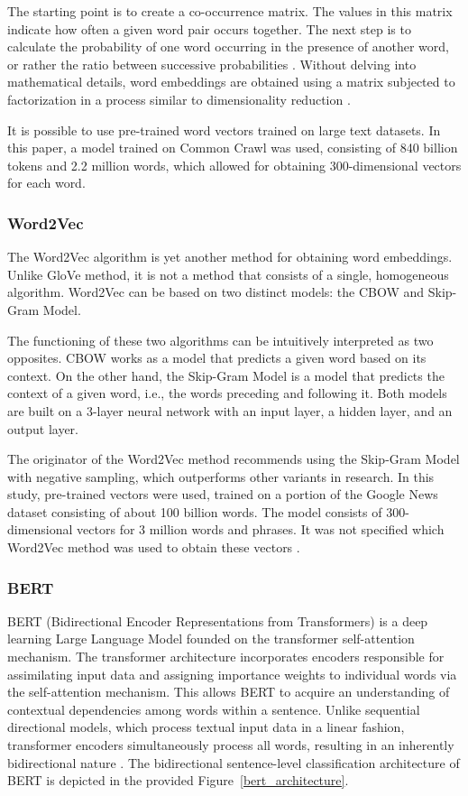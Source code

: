 The starting point is to create a co-occurrence matrix. The values in this matrix indicate how often a given word pair occurs together. The next step is to calculate the probability of one word occurring in the presence of another word, or rather the ratio between successive probabilities \autocite{Pennington2014}. Without delving into mathematical details, word embeddings are obtained using a matrix subjected to factorization in a process similar to dimensionality reduction \autocite{Albrecht2020}.

It is possible to use pre-trained word vectors trained on large text datasets. In this paper, a model trained on Common Crawl was used, consisting of 840 billion tokens and 2.2 million words, which allowed for obtaining 300-dimensional vectors for each word.

\subsubsection{Word2Vec}
The Word2Vec algorithm is yet another method for obtaining word embeddings. Unlike GloVe method, it is not a method that consists of a single, homogeneous algorithm. Word2Vec can be based on two distinct models: the CBOW and Skip-Gram Model.

The functioning of these two algorithms can be intuitively interpreted as two opposites. CBOW works as a model that predicts a given word based on its context. On the other hand, the Skip-Gram Model is a model that predicts the context of a given word, i.e., the words preceding and following it. Both models are built on a 3-layer neural network with an input layer, a hidden layer, and an output layer.

The originator of the Word2Vec method recommends using the Skip-Gram Model with negative sampling, which outperforms other variants in research. In this study, pre-trained vectors were used, trained on a portion of the Google News dataset consisting of about 100 billion words. The model consists of 300-dimensional vectors for 3 million words and phrases. It was not specified which Word2Vec method was used to obtain these vectors \autocite{Mikolov2013}.

\subsubsection{BERT}
BERT (Bidirectional Encoder Representations from Transformers) is a deep learning Large Language Model founded on the transformer self-attention mechanism. The transformer architecture incorporates encoders responsible for assimilating input data and assigning importance weights to individual words via the self-attention mechanism. This allows BERT to acquire an understanding of contextual dependencies among words within a sentence. Unlike sequential directional models, which process textual input data in a linear fashion, transformer encoders simultaneously process all words, resulting in an inherently bidirectional nature \autocite{Vaswani2017}. The bidirectional sentence-level classification architecture of BERT is depicted in the provided Figure~\ref{bert_architecture}.

